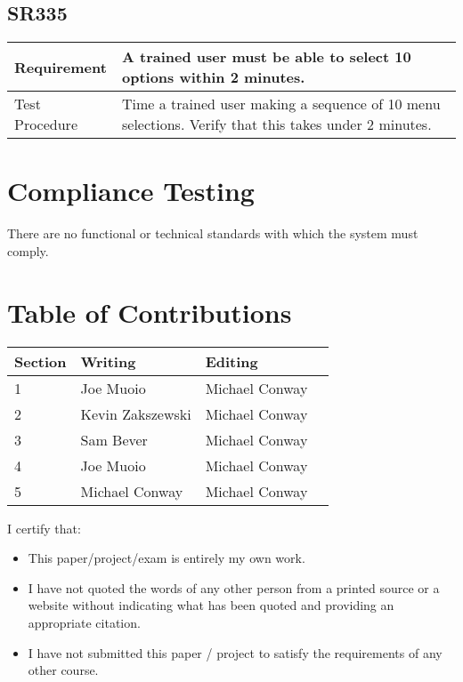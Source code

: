 \documentclass{article}
\begin{document}
\subsection{SR335}
\begin{tabular}{| l | p{12cm}  |}
    \hline
	Requirement & A trained user must be able to select 10 options within 2 minutes. \\ \hline
	Test Procedure & Time a trained user making a sequence of 10 menu selections. Verify that this takes under 2 minutes. \\ \hline
\end{tabular}

\newpage

\section{Compliance Testing}

There are no functional or technical standards with which the system must
comply.

\newpage
\section*{\centering Table of Contributions}
\begin{tabular}{| l | l | l | l |}
    \hline
     Section & Writing & Editing \\
    \hline \hline
		1 & Joe Muoio & Michael Conway \\ \hline
		2 & Kevin Zakszewski & Michael Conway \\ \hline
		3 & Sam Bever & Michael Conway \\ \hline
		4 & Joe Muoio & Michael Conway \\ \hline
		5 & Michael Conway & Michael Conway \\ \hline
\end{tabular}
\newpage
\noindent I certify that:
\begin{itemize}
\item This paper/project/exam is entirely my own work.
\item I have not quoted the words of any other person from a printed source or a website without indicating what has been quoted and providing an appropriate citation.
\item I have not submitted this paper / project to satisfy the requirements of any other course.
\end{itemize}
\end{document}

